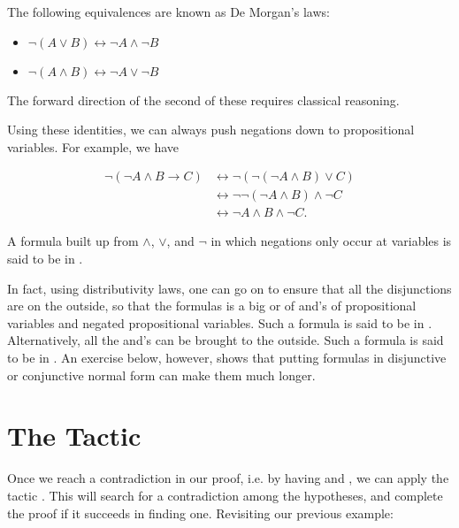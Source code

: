 \documentclass[letterpaper,10pt,english]{sphinxmanual}
\begin{document}
\sphinxAtStartPar
The following equivalences are known as De Morgan’s laws:
\begin{itemize}
\item {} 
\sphinxAtStartPar
\(\neg (A \vee B) \leftrightarrow \neg A \wedge \neg B\)

\item {} 
\sphinxAtStartPar
\(\neg (A \wedge B) \leftrightarrow \neg A \vee \neg B\)

\end{itemize}

\sphinxAtStartPar
The forward direction of the second of these requires classical reasoning.

\sphinxAtStartPar
Using these identities, we can always push negations down to propositional variables. For example, we have



\begin{align*}
  \neg (\neg A \wedge B \to C)
    & \leftrightarrow \neg (\neg (\neg A \wedge B) \vee C) \\
    & \leftrightarrow \neg \neg (\neg A \wedge B) \wedge \neg C \\
    & \leftrightarrow \neg A \wedge B \wedge \neg C.
\end{align*}

\sphinxAtStartPar
A formula built up from \(\wedge\), \(\vee\), and \(\neg\) in which negations only occur at variables is said to be in .

\sphinxAtStartPar
In fact, using distributivity laws, one can go on to ensure that all the disjunctions are on the outside, so that the formulas is a big or of and’s of propositional variables and negated propositional variables. Such a formula is said to be in . Alternatively, all the and’s can be brought to the outside. Such a formula is said to be in . An exercise below, however, shows that putting formulas in disjunctive or conjunctive normal form can make them much longer.


\section{The  Tactic}
\label{\detokenize{classical_reasoning:the-contradiction-tactic}}
\sphinxAtStartPar
Once we reach a contradiction in our proof,
i.e. by having  and ,
we can apply the tactic .
This will search for a contradiction among the hypotheses,
and complete the proof if it succeeds in finding one.
Revisiting our previous example:
\end{document}
